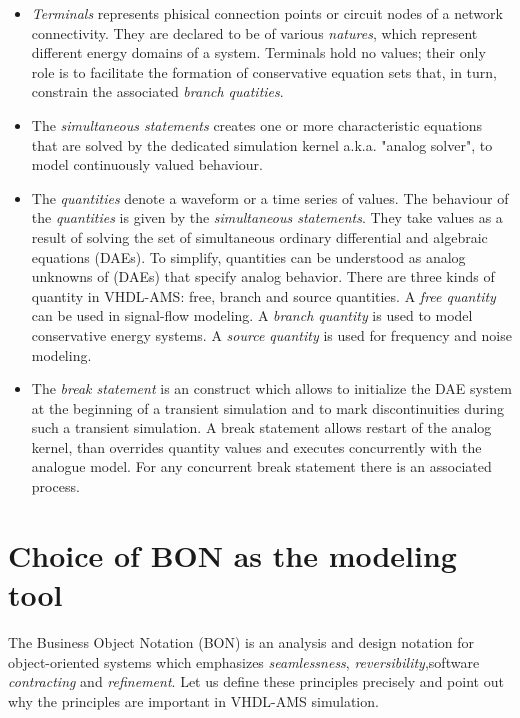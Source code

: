 \documentclass{article}
\begin{document}
\begin{itemize}
\item 
\emph{Terminals} represents phisical connection points or circuit nodes 
of a network connectivity. They are declared to be of various 
\emph{natures}, which represent different energy domains of a system.
Terminals hold no values; their only role is to facilitate the formation
of conservative equation sets that, in turn, constrain the associated 
\emph{branch quatities}. 
\item
The \emph{simultaneous statements} creates one or more characteristic 
equations that are solved by the dedicated simulation kernel a.k.a.
"analog solver", to model continuously valued behaviour.  
\item
The \emph{quantities} denote a waveform or a time series of values.
The behaviour of the \emph{quantities} is given by the \emph{simultaneous
 statements}. They take values as a result of solving the set of simultaneous 
ordinary differential and algebraic equations (DAEs). To simplify, 
quantities can be understood as analog unknowns of (DAEs) that specify 
analog behavior. There are three kinds of quantity in VHDL-AMS: free, 
branch and source quantities. A \emph{free quantity} can be used in 
signal-flow modeling. A \emph{branch quantity} is used to model conservative energy
systems. A \emph{source quantity} is used for frequency and noise modeling.
\item
The \emph{break statement} is an construct which allows to 
initialize the DAE system at the beginning of a transient 
simulation and to mark discontinuities during such a transient 
simulation. A break statement allows restart of the analog kernel,
than overrides quantity values and executes concurrently with the analogue model. 
For any concurrent break statement there is an associated process.
\end{itemize} 
 
\section{Choice of BON as the modeling tool}
The Business Object Notation (BON) is an analysis and design notation 
for object-oriented systems  which emphasizes \emph{seamlessness}, 
\emph{reversibility},software \emph{contracting} and \emph{refinement}. 
Let us define these principles precisely and point out why the principles 
are important in VHDL-AMS simulation.
\end{document}
